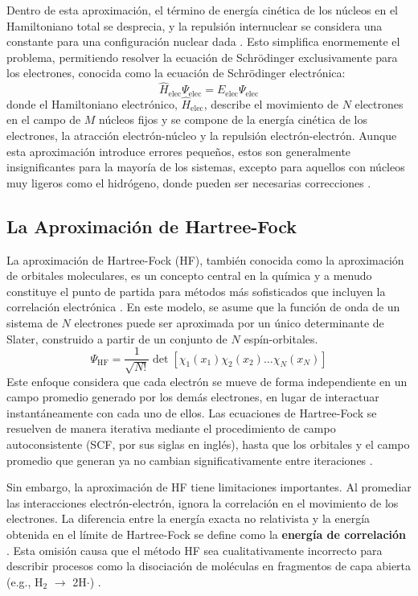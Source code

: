 Dentro de esta aproximación, el término de energía cinética de los núcleos en el Hamiltoniano total se desprecia, y la repulsión internuclear se considera una constante para una configuración nuclear dada \cite[p. 58]{szabo1996modern}. Esto simplifica enormemente el problema, permitiendo resolver la ecuación de Schrödinger exclusivamente para los electrones, conocida como la ecuación de Schrödinger electrónica:
$$ \hat{H}_{\text{elec}} \Psi_{\text{elec}} = E_{\text{elec}} \Psi_{\text{elec}} $$
donde el Hamiltoniano electrónico, $\hat{H}_{\text{elec}}$, describe el movimiento de $N$ electrones en el campo de $M$ núcleos fijos y se compone de la energía cinética de los electrones, la atracción electrón-núcleo y la repulsión electrón-electrón. Aunque esta aproximación introduce errores pequeños, estos son generalmente insignificantes para la mayoría de los sistemas, excepto para aquellos con núcleos muy ligeros como el hidrógeno, donde pueden ser necesarias correcciones \cite[p. 107]{jensen2017introduction}.

\subsection{La Aproximación de Hartree-Fock}
La aproximación de Hartree-Fock (HF), también conocida como la aproximación de orbitales moleculares, es un concepto central en la química y a menudo constituye el punto de partida para métodos más sofisticados que incluyen la correlación electrónica \cite[p. 123]{szabo1996modern}. En este modelo, se asume que la función de onda de un sistema de $N$ electrones puede ser aproximada por un único determinante de Slater, construido a partir de un conjunto de $N$ espín-orbitales.
$$ \Psi_{\text{HF}} = \frac{1}{\sqrt{N!}} \det[\chi_1(x_1) \chi_2(x_2) \dots \chi_N(x_N)] $$
Este enfoque considera que cada electrón se mueve de forma independiente en un campo promedio generado por los demás electrones, en lugar de interactuar instantáneamente con cada uno de ellos. Las ecuaciones de Hartree-Fock se resuelven de manera iterativa mediante el procedimiento de campo autoconsistente (SCF, por sus siglas en inglés), hasta que los orbitales y el campo promedio que generan ya no cambian significativamente entre iteraciones \cite[p. 69]{szabo1996modern}.

Sin embargo, la aproximación de HF tiene limitaciones importantes. Al promediar las interacciones electrón-electrón, ignora la correlación en el movimiento de los electrones. La diferencia entre la energía exacta no relativista y la energía obtenida en el límite de Hartree-Fock se define como la \textbf{energía de correlación} \cite[p. 246]{szabo1996modern}. Esta omisión causa que el método HF sea cualitativamente incorrecto para describir procesos como la disociación de moléculas en fragmentos de capa abierta (e.g., H$_2$ $\rightarrow$ 2H$\cdot$) \cite[p. 246]{szabo1996modern}.

